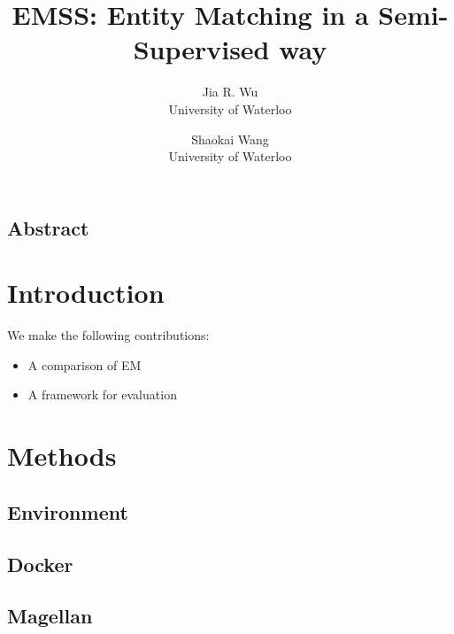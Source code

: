 \documentclass[letterpaper,twocolumn,10pt]{article}
\begin{document}
\date{}

\title{\Large \bf EMSS: Entity Matching in a Semi-Supervised way}




\author{
{\rm Jia R. Wu}\\
University of Waterloo
\and
{\rm Shaokai Wang}\\
University of Waterloo
} %

\maketitle

\thispagestyle{empty}


\subsection*{Abstract}


\section{Introduction}


We make the following contributions:
\begin{itemize}
  \item A comparison of EM 
  \item A framework for evaluation
\end{itemize}

\section{Methods}

\subsection{Environment}

\subsection{Docker}

\subsection{Magellan}
\end{document}

